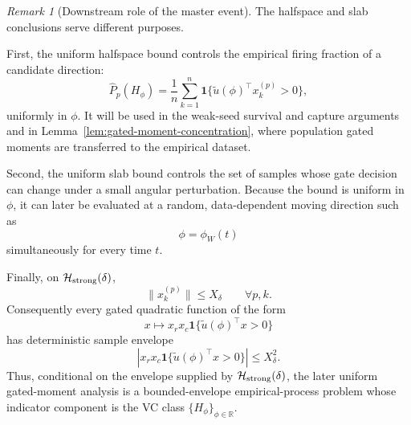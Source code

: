 \documentclass{article} %
\theoremstyle{plain}
\theoremstyle{definition}
\theoremstyle{remark}
\newtheorem{remark}[theorem]{Remark}
\begin{document}
\begin{remark}[Downstream role of the master event]
\label{rem:Hstrong-downstream}
The halfspace and slab conclusions serve different purposes.

First, the uniform halfspace bound controls the empirical firing fraction
of a candidate direction:
\[
\widehat P_p(H_\phi)
=
\frac1n
\sum_{k=1}^n
\mathbf 1\{
\widetilde u(\phi)^\top x_k^{(p)}>0
\},
\]
uniformly in $\phi$. It will be used in the weak-seed survival and capture
arguments and in Lemma~\ref{lem:gated-moment-concentration}, where
population gated moments are transferred to the empirical dataset.

Second, the uniform slab bound controls the set of samples whose gate
decision can change under a small angular perturbation. Because the bound
is uniform in $\phi$, it can later be evaluated at a random,
data-dependent moving direction such as
\[
\phi=\phi_W(t)
\]
simultaneously for every time $t$.

Finally, on $\mathcal H_{\rm strong}(\delta)$,
\[
\|x_k^{(p)}\|
\le
X_\delta
\qquad
\forall p,k.
\]
Consequently every gated quadratic function of the form
\[
x
\longmapsto
x_r x_c
\mathbf 1\{
\widetilde u(\phi)^\top x>0
\}
\]
has deterministic sample envelope
\[
\left|
x_r x_c
\mathbf 1\{
\widetilde u(\phi)^\top x>0
\}
\right|
\le
X_\delta^2.
\]
Thus, conditional on the envelope supplied by
$\mathcal H_{\rm strong}(\delta)$, the later uniform gated-moment
analysis is a bounded-envelope empirical-process problem whose indicator
component is the VC class $\{H_\phi\}_{\phi\in\mathbb R}$.
\end{remark}


\end{document}
